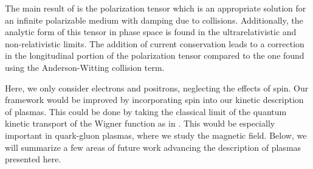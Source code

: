 The main result of \cite{Formanek:2021blc} is the polarization tensor  which is an appropriate solution for an infinite polarizable medium with damping due to collisions. Additionally, the analytic form of this tensor in phase space is found in the ultrarelativistic and non-relativistic limits. The addition of current conservation leads to a correction in the longitudinal portion of the polarization tensor compared to the one found using the Anderson-Witting collision term.

Here, we only consider electrons and positrons, neglecting the effects of spin. Our framework would be improved by incorporating spin into our kinetic description of plasmas. This could be done by taking the classical limit of the quantum kinetic transport of the Wigner function as in \cite{hurst2014semiclassical}. This would be especially important in quark-gluon plasmas, where we study the magnetic field. Below, we will summarize a few areas of future work advancing the description of plasmas presented here. 

